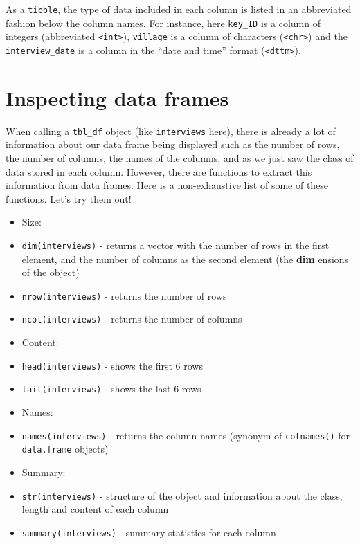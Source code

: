 \documentclass[]{book}
\begin{document}
As a \texttt{tibble}, the type of data included in each column is listed
in an abbreviated fashion below the column names. For instance, here
\texttt{key\_ID} is a column of integers (abbreviated
\texttt{\textless{}int\textgreater{}}), \texttt{village} is a column of
characters (\texttt{\textless{}chr\textgreater{}}) and the
\texttt{interview\_date} is a column in the ``date and time'' format
(\texttt{\textless{}dttm\textgreater{}}).

\section{Inspecting data frames}\label{inspecting-data-frames}

When calling a \texttt{tbl\_df} object (like \texttt{interviews} here),
there is already a lot of information about our data frame being
displayed such as the number of rows, the number of columns, the names
of the columns, and as we just saw the class of data stored in each
column. However, there are functions to extract this information from
data frames. Here is a non-exhaustive list of some of these functions.
Let's try them out!

\begin{itemize}
\item
  Size:
\item
  \texttt{dim(interviews)} - returns a vector with the number of rows in
  the first element, and the number of columns as the second element
  (the \textbf{dim} ensions of the object)
\item
  \texttt{nrow(interviews)} - returns the number of rows
\item
  \texttt{ncol(interviews)} - returns the number of columns
\item
  Content:
\item
  \texttt{head(interviews)} - shows the first 6 rows
\item
  \texttt{tail(interviews)} - shows the last 6 rows
\item
  Names:
\item
  \texttt{names(interviews)} - returns the column names (synonym of
  \texttt{colnames()} for \texttt{data.frame} objects)
\item
  Summary:
\item
  \texttt{str(interviews)} - structure of the object and information
  about the class, length and content of each column
\item
  \texttt{summary(interviews)} - summary statistics for each column
\end{itemize}
\end{document}
